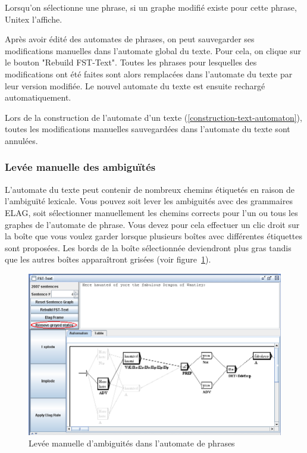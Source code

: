 \bigskip
\noindent Lorsqu’on sélectionne une phrase, si un graphe modifié existe pour cette phrase,
Unitex l'affiche.

\bigskip
\noindent Après avoir édité des automates de phrases, on peut sauvegarder ses modifications
manuelles dans l’automate global du texte. Pour cela, on clique sur le bouton "Rebuild FST-Text". Toutes les phrases
pour lesquelles des modifications ont été faites sont alors remplacées dans l’automate du
texte par leur version modifiée. Le nouvel automate du texte est ensuite rechargé automatiquement.

\bigskip
\noindent Lors de la construction de l’automate d’un texte (\ref{construction-text-automaton}), toutes les
modifications manuelles sauvegardées dans l'automate du texte sont annulées.


\subsubsection{Levée manuelle des ambiguïtés}
L’automate du texte peut contenir de nombreux chemins étiquetés en raison de l'ambiguïté lexicale.
Vous pouvez soit lever les ambiguités avec des grammaires ELAG, soit sélectionner manuellement les chemins
corrects pour l'un ou tous les graphes de l'automate de phrase. Vous devez pour cela effectuer un
clic droit sur la boîte que vous voulez garder lorsque plusieurs boîtes avec différentes étiquettes
sont proposées. Les bords de la boîte sélectionnée deviendront plus gras tandis que les autres
boîtes apparaîtront grisées (voir figure~\ref{fig-manually-resolve-ambiguities}).

\begin{figure}[!ht]
\begin{center}
\includegraphics[width=15cm]{resources/img/fig7-24b.png}
\caption{Levée manuelle d'ambiguités dans l'automate de
phrases\label{fig-manually-resolve-ambiguities}}
\end{center}
\end{figure} 

